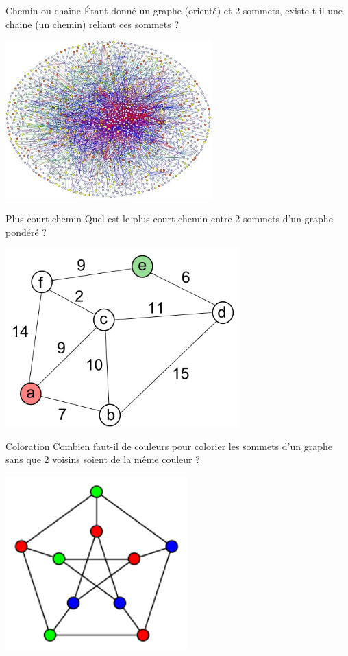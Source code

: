 \documentclass[10pt]{beamer}
\begin{document}
\begin{frame}{Chemin ou chaîne}
\'Etant donné un graphe (orienté) et 2 sommets, existe-t-il une chaine (un chemin) reliant ces sommets ?
\begin{center}
\includegraphics[width=8cm]{img/biggraph}
\end{center}
\end{frame}

\begin{frame}{Plus court chemin}
Quel est le plus court chemin entre 2 sommets d'un graphe pondéré ?
\begin{center}
\includegraphics[width=9cm]{img/dijkstra}
\end{center}
\end{frame}

\begin{frame}{Coloration}
Combien faut-il de couleurs pour colorier les sommets d'un graphe sans que 2 voisins soient de la même couleur ?
\begin{center}
\includegraphics[width=7cm]{img/color}
\end{center}
\end{frame}
\end{document}
